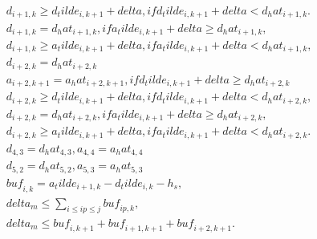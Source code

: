 \begin{align}
  & d_{i + 1 , k} \geq d_tilde_{i , k + 1} + \mathit{delta} , if d_tilde_{i , k + 1} + \mathit{delta} < d_hat_{i + 1 , k} . \tag{eq\_0014} \\
  & d_{i + 1 , k} = d_hat_{i + 1 , k} , if a_tilde_{i , k + 1} + \mathit{delta} \geq d_hat_{i + 1 , k} , \tag{eq\_0015} \\
  & d_{i + 1 , k} \geq a_tilde_{i , k + 1} + \mathit{delta} , if a_tilde_{i , k + 1} + \mathit{delta} < d_hat_{i + 1 , k} , \tag{eq\_0016} \\
  & d_{i+2,k} = d_hat_{i+2,k} \tag{eq\_0017\_a} \\
  & a_{i+2,k+1} = a_hat_{i+2,k+1} , if d_tilde_{i,k+1} + \mathit{delta} \geq d_hat_{i+2,k} \tag{eq\_0017\_b} \\
  & d_{i + 2 , k} \geq d_tilde_{i , k + 1} + \mathit{delta} , if d_tilde_{i , k + 1} + \mathit{delta} < d_hat_{i + 2 , k} , \tag{eq\_0018} \\
  & d_{i + 2 , k} = d_hat_{i + 2 , k} , if a_tilde_{i , k + 1} + \mathit{delta} \geq d_hat_{i + 2 , k} , \tag{eq\_0019} \\
  & d_{i + 2 , k} \geq a_tilde_{i , k + 1} + \mathit{delta} , if a_tilde_{i , k + 1} + \mathit{delta} < d_hat_{i + 2 , k} . \tag{eq\_0020} \\
  & d_{4,3} = d_hat_{4,3} , a_{4,4} = a_hat_{4,4} \tag{eq\_0023\_a} \\
  & d_{5,2} = d_hat_{5,2} , a_{5,3} = a_hat_{5,3} \tag{eq\_0023\_b} \\
  & \mathit{buf}_{i , k} = a_tilde_{i + 1 , k} - d_tilde_{i , k} - h_{s} , \tag{eq\_0036} \\
  & \mathit{delta}_{m} \leq \sum_{i \leq ip \leq j} \mathit{buf}_{ip , k} , \tag{eq\_0037} \\
  & \mathit{delta}_{m} \leq \mathit{buf}_{i , k + 1} + \mathit{buf}_{i + 1 , k + 1} + \mathit{buf}_{i + 2 , k + 1} . \tag{eq\_0039} \\
\end{align}
